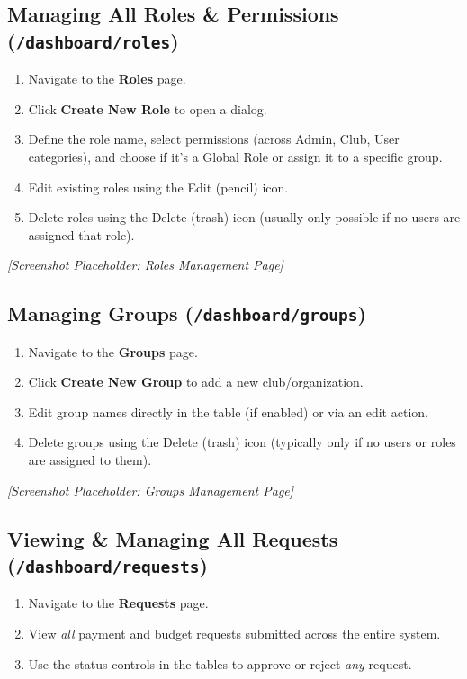 \documentclass{article}
\begin{document}
\subsection{Managing All Roles \& Permissions (\texttt{/dashboard/roles})}
\begin{enumerate}
    \item Navigate to the \textbf{Roles} page.
    \item Click \textbf{Create New Role} to open a dialog.
    \item Define the role name, select permissions (across Admin, Club, User categories), and choose if it's a Global Role or assign it to a specific group.
    \item Edit existing roles using the Edit (pencil) icon.
    \item Delete roles using the Delete (trash) icon (usually only possible if no users are assigned that role).
\end{enumerate}
\textit{[Screenshot Placeholder: Roles Management Page]}

\subsection{Managing Groups (\texttt{/dashboard/groups})}
\begin{enumerate}
    \item Navigate to the \textbf{Groups} page.
    \item Click \textbf{Create New Group} to add a new club/organization.
    \item Edit group names directly in the table (if enabled) or via an edit action.
    \item Delete groups using the Delete (trash) icon (typically only if no users or roles are assigned to them).
\end{enumerate}
\textit{[Screenshot Placeholder: Groups Management Page]}

\subsection{Viewing \& Managing All Requests (\texttt{/dashboard/requests})}
\begin{enumerate}
    \item Navigate to the \textbf{Requests} page.
    \item View \textit{all} payment and budget requests submitted across the entire system.
    \item Use the status controls in the tables to approve or reject \textit{any} request.
\end{enumerate}
\end{document}
